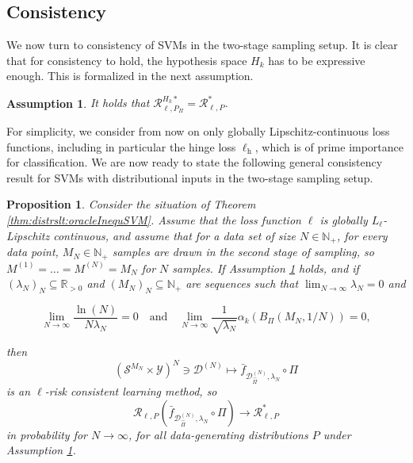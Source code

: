 \documentclass[letterpaper]{article} %
\newcommand{\R}{\mathbb{R}}
\newcommand{\Rp}{\R_{> 0}}
\newcommand{\Np}{\mathbb{N}_+}
\newcommand{\samplingSet}{\mathcal{S}} %
\newcommand{\outputSet}{\mathcal{Y}} %
\newcommand{\dataSet}{\mathcal{D}}
\newcommand{\risk}{\mathcal{R}} %
\newcommand{\Risk}[2]{\risk_{{#1},{#2}}} %
\newcommand{\RiskBayes}[2]{\risk_{{#1},{#2}}^\ast} %
\newcommand{\hilbertianEmbed}{\Pi} %
\newcommand{\RiskOpt}[3]{\Risk{#1}{#2}^{#3\ast}}
\newcommand{\hilbertianEmbedBound}{B_\hilbertianEmbed} %
\newcommand{\clipped}[1]{\bar{#1}}
\newcommand{\ellHinge}{\ell_{\mathrm{h}}} %
\newtheorem{proposition}[theorem]{Proposition}
\newtheorem{assumption}[theorem]{Assumption}
\newif\ifTwoColumns
\begin{document}
\subsection{Consistency} \label{sec:distrslt:consistency}
We now turn to consistency of SVMs in the two-stage sampling setup.
It is clear that for consistency to hold, the hypothesis space $H_k$ has to be expressive enough.
This is formalized in the next assumption.
\begin{assumption} \label{assumption:distrslt:noApproxError}
    It holds that $\RiskOpt{\ell}{P_\hilbertianEmbed}{H_k}=\RiskBayes{\ell}{P}$.
\end{assumption}
For simplicity, we consider from now on only globally Lipschitz-continuous loss functions, including in particular the hinge loss $\ellHinge$, which is of prime importance for classification.
We are now ready to state the following general consistency result for SVMs with distributional inputs in the two-stage sampling setup.
\begin{proposition} \label{prop:distrslt:consistencySVM}
Consider the situation of Theorem \ref{thm:distrslt:oracleInequSVM}.
Assume that the loss function $\ell$ is globally $L_\ell$-Lipschitz continuous, and 
assume that for a data set of size $N\in\Np$, for every data point, $M_N\in\Np$ samples are drawn in the second stage of sampling, so $M^{(1)}=\ldots=M^{(N)}=M_N$ for $N$ samples.
If Assumption \ref{assumption:distrslt:noApproxError} holds, 
and if $(\lambda_N)_N\subseteq\Rp$ and $(M_N)_N\subseteq\Np$ are sequences such that $\lim_{N\rightarrow\infty} \lambda_N = 0$ and
\ifTwoColumns
\begin{equation} \label{eq:distrslt:consistencySVM:conditionsForSequences}
    \lim_{N\rightarrow\infty} \frac{\ln(N)}{N\lambda_N} 
    = \lim_{N\rightarrow\infty} \frac{1}{\sqrt{\lambda_N}} \alpha_k(\hilbertianEmbedBound(M_N,1/N)) = 0,
\end{equation}
\else
\begin{equation} \label{eq:distrslt:consistencySVM:conditionsForSequences}
    \lim_{N\rightarrow\infty} \frac{\ln(N)}{N\lambda_N} = 0
    \quad \text{and} \quad
    \lim_{N\rightarrow\infty} \frac{1}{\sqrt{\lambda_N}} \alpha_k(\hilbertianEmbedBound(M_N,1/N)) = 0,
\end{equation}
\fi
then 
\begin{equation*}
    (\samplingSet^{M_N}\times \outputSet)^N \ni \dataSet^{(N)}\mapsto \clipped{f}_{\dataSet^{(N)}_{\hat\hilbertianEmbed},\lambda_N} \circ \hilbertianEmbed
\end{equation*}
is an $\ell$-risk consistent learning method, so
\begin{equation*}
    \Risk{\ell}{P}(\clipped{f}_{\dataSet^{(N)}_{\hat\hilbertianEmbed},\lambda_N} \circ \hilbertianEmbed) \rightarrow \RiskBayes{\ell}{P}
\end{equation*}
in probability for $N\rightarrow\infty$, for all data-generating distributions $P$ under Assumption \ref{assumption:distrslt:noApproxError}.
\end{proposition}
\end{document}
